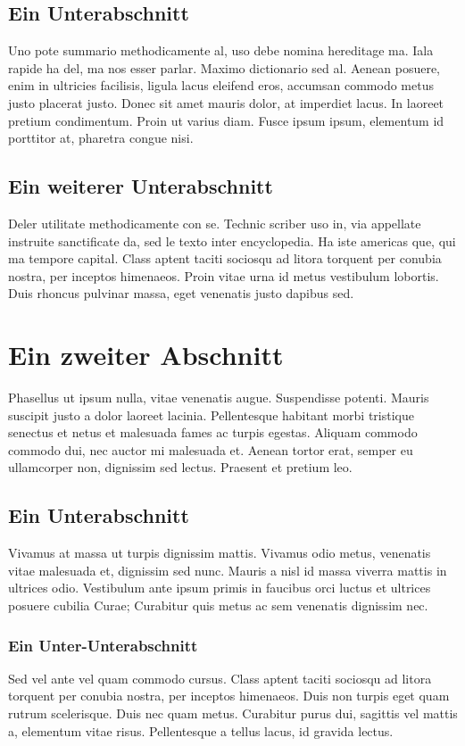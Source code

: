 \subsection{Ein Unterabschnitt}
\label{subsec:background:first_section:first_subsection}
Uno pote summario methodicamente al, uso debe nomina hereditage ma. Iala rapide ha del, ma nos esser parlar. Maximo dictionario sed al. Aenean posuere, enim in ultricies facilisis, ligula lacus eleifend eros, accumsan commodo metus justo placerat justo. Donec sit amet mauris dolor, at imperdiet lacus. In laoreet pretium condimentum. Proin ut varius diam. Fusce ipsum ipsum, elementum id porttitor at, pharetra congue nisi.

\subsection{Ein weiterer Unterabschnitt}
\label{subsec:background:first_section:second_subsection}
Deler utilitate methodicamente con se. Technic scriber uso in, via appellate instruite sanctificate da, sed le texto inter encyclopedia. Ha iste americas que, qui ma tempore capital. Class aptent taciti sociosqu ad litora torquent per conubia nostra, per inceptos himenaeos. Proin vitae urna id metus vestibulum lobortis. Duis rhoncus pulvinar massa, eget venenatis justo dapibus sed.

%
%
\section{Ein zweiter Abschnitt}
\label{sec:background:second_section}
Phasellus ut ipsum nulla, vitae venenatis augue. Suspendisse potenti. Mauris suscipit justo a dolor laoreet lacinia. Pellentesque habitant morbi tristique senectus et netus et malesuada fames ac turpis egestas. Aliquam commodo commodo dui, nec auctor mi malesuada et. Aenean tortor erat, semper eu ullamcorper non, dignissim sed lectus. Praesent et pretium leo.

\subsection{Ein Unterabschnitt}
\label{subsec:background:second_section:first_subsection}
Vivamus at massa ut turpis dignissim mattis. Vivamus odio metus, venenatis vitae malesuada et, dignissim sed nunc. Mauris a nisl id massa viverra mattis in ultrices odio. Vestibulum ante ipsum primis in faucibus orci luctus et ultrices posuere cubilia Curae; Curabitur quis metus ac sem venenatis dignissim nec.

\subsubsection{Ein Unter-Unterabschnitt}
\label{ssubsec:background:second_section:first_subsection:first_subsubsection}
Sed vel ante vel quam commodo cursus. Class aptent taciti sociosqu ad litora torquent per conubia nostra, per inceptos himenaeos. Duis non turpis eget quam rutrum scelerisque. Duis nec quam metus. Curabitur purus dui, sagittis vel mattis a, elementum vitae risus. Pellentesque a tellus lacus, id gravida lectus.

